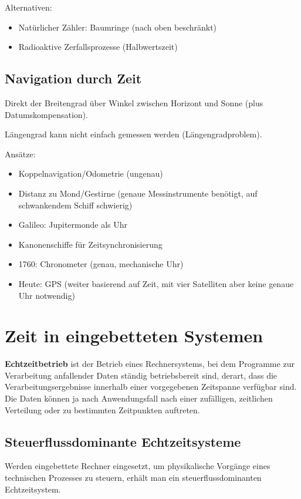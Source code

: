 Alternativen:
\begin{itemize}
    \item Natürlicher Zähler: Baumringe (nach oben beschränkt)
    \item Radioaktive Zerfallsprozesse (Halbwertszeit)
\end{itemize}

\subsection{Navigation durch Zeit}
Direkt der Breitengrad über Winkel zwischen Horizont und Sonne (plus Datumskompensation).

Längengrad kann nicht einfach gemessen werden (\glqq{}Längengradproblem\grqq{}).

Ansätze:
\begin{itemize}
    \item Koppelnavigation/Odometrie (ungenau)
    \item Distanz zu Mond/Gestirne (genaue Messinstrumente benötigt, auf schwankendem Schiff schwierig)
    \item Galileo: Jupitermonde als Uhr
    \item Kanonenschiffe für Zeitsynchronisierung
    \item 1760: Chronometer (genau, mechanische Uhr)
    \item Heute: GPS (weiter basierend auf Zeit, mit vier Satelliten aber keine genaue Uhr notwendig)
\end{itemize}

\section{Zeit in eingebetteten Systemen}
\begin{tcolorbox}
    \textbf{Echtzeitbetrieb} ist der Betrieb eines Rechnersystems, bei dem Programme zur 
    Verarbeitung anfallender Daten ständig betriebsbereit sind, derart, dass die
    Verarbeitungsergebnisse innerhalb einer vorgegebenen Zeitspanne verfügbar sind.
    Die Daten können ja nach Anwendungsfall nach einer zufälligen, zeitlichen Verteilung
    oder zu bestimmten Zeitpunkten auftreten.
\end{tcolorbox}

\subsection{Steuerflussdominante Echtzeitsysteme}
Werden eingebettete Rechner eingesetzt, um physikalische Vorgänge eines technischen
Prozesses zu steuern, erhält man ein steuerflussdominanten Echtzeitsystem.

